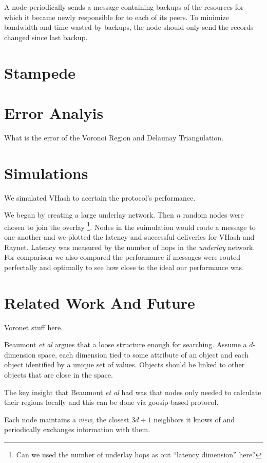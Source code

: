 \documentclass{IEEEtran}
\begin{document}
A node periodically sends a message containing backups of the resources for which it became newly responsible for to each of its peers. To minimize bandwidth and time wasted by backups, the node should only send the records changed since last backup.




\section{Stampede}


\section{Error Analyis}
What is the error of the Voronoi Region and Delaunay Triangulation.


\section{Simulations}
We simulated VHash to acertain the protocol's performance. 


We began by creating a large underlay network.  Then $n$ random nodes were chosen to join the overlay \footnote{Can we used the number of underlay hops as out ``latency dimension'' here? }.  Nodes in the suimulation would route a message to one another and we plotted the latency and successful deliveries for VHash and Raynet.  Latency was measured by the number of hops in the \textit{underlay} network.  For comparison we also compared the performance if messages were routed perfectally and optimally to see how close to the ideal our performance was. 




\section{Related Work And Future}
Voronet stuff here.


Beaumont \textit{et al} \cite{raynet}  argues that a loose structure enough for searching.  Assume a $d$-dimension space, each dimension tied to some attribute of an object and each object identified by a unique set of values.  Objects should be linked to other objects that are close in the space.
 

The key insight that Beaumont \textit{et al} had  was that nodes only needed to calculate their regions locally and this can be done via goosip-based protocol.

Each node maintains a \textit{view}, the closest $3d+1$ neighbors it knows of and periodically exchanges information with them.
\end{document}
